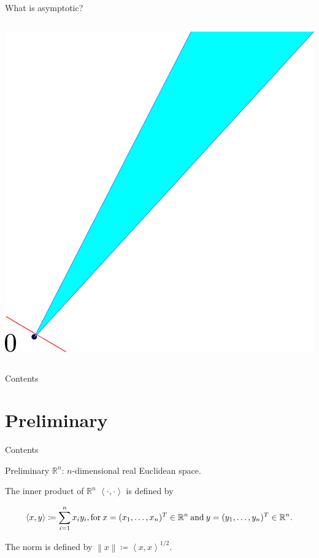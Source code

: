 \documentclass[aspectratio=169, dvipdfmx, 11pt]{beamer} %
\newcommand{\NDemenstionalRealEuclidianSpace}{\mathbb{R}^n}
\begin{document}
\begin{frame}{What is asymptotic?}
\begin{columns}
\begin{column}{0.48\textwidth}
            \includegraphics[keepaspectratio, scale=0.095]{figures/asymptotic_meaning_2.eps}
        \end{column}
    \end{columns}
\end{frame}

\begin{frame}{Contents}
    \tableofcontents
\end{frame}

\section{Preliminary}
\begin{frame}{Contents}
    \tableofcontents[currentsection]
\end{frame}

\begin{frame}{Preliminary}
$\NDemenstionalRealEuclidianSpace$: $n$-dimensional real Euclidean space.

The inner product of $\NDemenstionalRealEuclidianSpace$ $\left\langle \cdot ,\cdot \right\rangle$  is defined by

\begin{equation}
    \left\langle x,y\right\rangle \coloneqq \sum_{i = 1}^{n} x_i y_i, \text{for}\: x=(x_1,\dots,x_n)^T \in \mathbb{R}^n \:\text{and}\: y=(y_1,\dots,y_n)^T \in \mathbb{R}^n. \notag
\end{equation}

The norm is defined by $\left\lVert x \right\rVert \coloneqq \left\langle x,x\right\rangle ^{1/2} $.

\end{frame}
\end{document}
